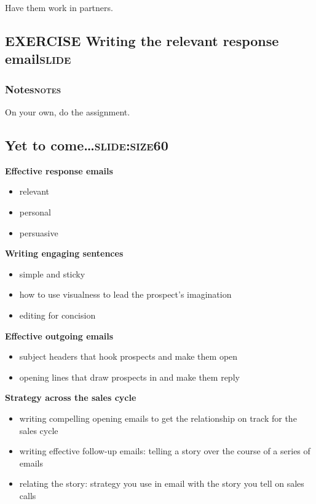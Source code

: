 \documentclass[11pt]{article}
\begin{document}
Have them work in partners.

\subsection{{\bfseries\sffamily EXERCISE} Writing the relevant response email\hfill{}\textsc{slide}}
\label{sec:org1cc6686}

\subsubsection{Notes\hfill{}\textsc{notes}}
\label{sec:orgade6f34}
On your own, do the assignment.

\subsection{Yet to come\ldots{}\hfill{}\textsc{slide:size60}}
\label{sec:orgf5fc659}

\textbf{Effective response emails}
\begin{itemize}
\item relevant
\item personal
\item persuasive
\end{itemize}

\textbf{Writing engaging sentences}
\begin{itemize}
\item simple and sticky
\item how to use visualness to lead the prospect's imagination
\item editing for concision
\end{itemize}

\textbf{Effective outgoing emails}
\begin{itemize}
\item subject headers that hook prospects and make them open
\item opening lines that draw prospects in and make them reply
\end{itemize}

\textbf{Strategy across the sales cycle}
\begin{itemize}
\item writing compelling opening emails to get the relationship on track for the sales cycle
\item writing effective follow-up emails: telling a story over the course of a series of emails
\item relating the story: strategy you use in email with the story you tell on sales calls
\end{itemize}
\end{document}
